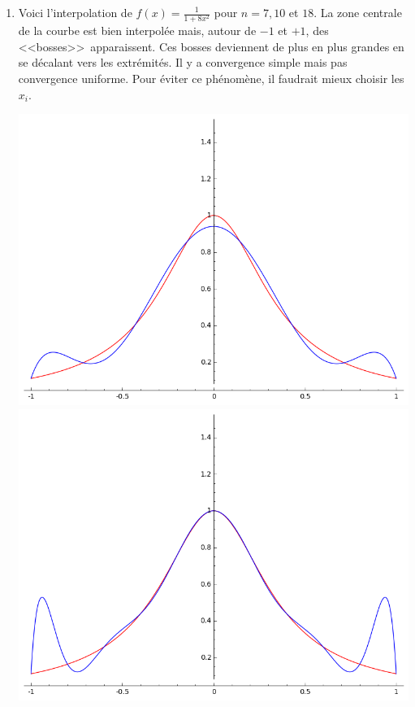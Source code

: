 \documentclass[class=report,crop=false]{standalone}
\begin{document}
\begin{enumerate}
  \item Voici l'interpolation de $f(x) = \frac{1}{1+8x^2}$
  pour $n=7,10$ et $18$. La zone centrale de la courbe est bien interpolée mais, autour de $-1$ et $+1$,
  des <<bosses>>\ apparaissent. Ces bosses deviennent de plus en plus grandes en se décalant vers les extrémités. 
  Il y a convergence simple mais pas convergence uniforme. Pour éviter ce phénomène, il faudrait mieux choisir les 
  $x_i$.
  \begin{center}
    \includegraphics[scale=0.22]{figures/runge1}\quad
    \includegraphics[scale=0.22]{figures/runge2}\quad

\end{center}
\end{enumerate}
\end{document}
